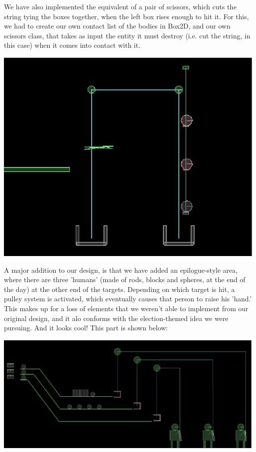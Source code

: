 \documentclass[a4paper,11pt]{article}
\begin{document}
We have also implemented the equivalent of a pair of scissors, which cuts the string tying the boxes together, when the left box rises enough to hit it. For this, we had to create our own contact list of the bodies in Box2D, and our own scissors class, that takes as input the entity it must destroy (i.e. cut the string, in this case) when it comes into contact with it.
\begin{center}
\includegraphics[scale=0.4]{doc/scissors.eps}
\end{center}

A major addition to our design, is that we have added an epilogue-style area, where there are three 'humans' (made of rods, blocks and spheres, at the end of the day) at the other end of the targets. Depending on which target is hit, a pulley system is activated, which eventually causes that person to raise his 'hand.' This makes up for a loss of elements that we weren't able to implement from our original design, and it alo conforms with the election-themed idea we were pursuing. And it looks cool! This part is shown below:

\begin{center}
\includegraphics{doc/people.eps}
\end{center}
\end{document}
